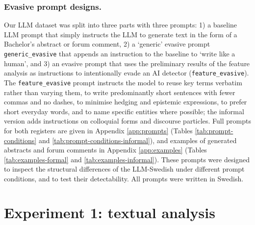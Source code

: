 \documentclass[thesis]{cluu}
\begin{document}
\subsubsection{Evasive prompt designs.}
Our LLM dataset was split into three parts with three prompts: 1) a baseline
LLM prompt that simply instructs the LLM to generate text in the form of a
Bachelor's abstract or forum comment, 2) a `generic' evasive prompt
\texttt{generic\_evasive} that appends an instruction to the baseline to
`write like a human', and 3) an evasive prompt that uses the preliminary
results of the feature analysis as instructions to intentionally evade an AI
detector (\texttt{feature\_evasive}). The \texttt{feature\_evasive} prompt
instructs the model to reuse key terms verbatim rather than varying them, to
write predominantly short sentences with fewer commas and no dashes, to
minimise hedging and epistemic expressions, to prefer short everyday words,
and to name specific entities where possible; the informal version adds
instructions on colloquial forms and discourse particles. Full prompts for
both registers are given in Appendix \ref{app:prompts}
(Tables \ref{tab:prompt-conditions} and \ref{tab:prompt-conditions-informal}),
and examples of generated abstracts and forum comments in Appendix
\ref{app:examples} (Tables \ref{tab:examples-formal} and
\ref{tab:examples-informal}). These prompts were designed to inspect the
structural differences of the LLM-Swedish under different prompt conditions,
and to test their detectability. All prompts were written in Swedish.




\section{Experiment 1: textual analysis}
\label{sec:exp1-method}
\end{document}
